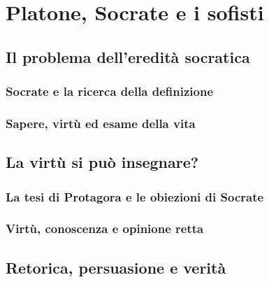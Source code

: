 \chapter{Platone, Socrate e i sofisti}
\label{cap:platone:sofisti}

\section{Il problema dell'eredità socratica}

\subsection{Socrate e la ricerca della definizione}

\subsection{Sapere, virtù ed esame della vita}

\section{La virtù si può insegnare?}

\subsection{La tesi di Protagora e le obiezioni di Socrate}

\subsection{Virtù, conoscenza e opinione retta}

\section{Retorica, persuasione e verità}

